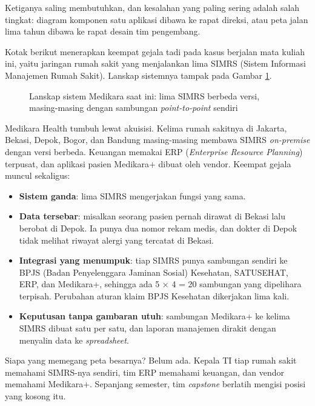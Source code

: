 Ketiganya saling membutuhkan, dan kesalahan yang paling sering adalah salah
tingkat: diagram komponen satu aplikasi dibawa ke rapat direksi, atau peta
jalan lima tahun dibawa ke rapat desain tim pengembang.

Kotak berikut menerapkan keempat gejala tadi pada kasus berjalan mata kuliah
ini, yaitu jaringan rumah sakit yang menjalankan lima SIMRS (Sistem Informasi
Manajemen Rumah Sakit). Lanskap sistemnya tampak pada Gambar
\ref{fig:ch01-lanskap}.

\begin{figure}[!htb]
  \centering
  
  \caption{Lanskap sistem Medikara saat ini: lima SIMRS berbeda versi, masing-masing
           dengan sambungan \textit{point-to-point} sendiri}
  \label{fig:ch01-lanskap}
\end{figure}

\begin{kasus}[title={Kasus Medikara Health: Lima Rumah Sakit, Lima SIMRS}]
  Medikara Health tumbuh lewat akuisisi. Kelima rumah sakitnya di Jakarta,
  Bekasi, Depok, Bogor, dan Bandung masing-masing membawa SIMRS
  \textit{on-premise} dengan versi berbeda. Keuangan memakai ERP
  (\textit{Enterprise Resource Planning}) terpusat, dan aplikasi pasien
  Medikara+ dibuat oleh vendor. Keempat gejala muncul sekaligus:

  \begin{itemize}
    \item \textbf{Sistem ganda}: lima SIMRS mengerjakan fungsi yang sama.
    \item \textbf{Data tersebar}: misalkan seorang pasien pernah dirawat di
          Bekasi lalu berobat di Depok. Ia punya dua nomor rekam medis, dan
          dokter di Depok tidak melihat riwayat alergi yang tercatat di Bekasi.
    \item \textbf{Integrasi yang menumpuk}: tiap SIMRS punya sambungan sendiri
          ke BPJS (Badan Penyelenggara Jaminan Sosial) Kesehatan, SATUSEHAT,
          ERP, dan Medikara+, sehingga ada 5 $\times$ 4 = 20 sambungan yang
          dipelihara terpisah. Perubahan aturan klaim BPJS Kesehatan dikerjakan
          lima kali.
    \item \textbf{Keputusan tanpa gambaran utuh}: sambungan Medikara+ ke kelima
          SIMRS dibuat satu per satu, dan laporan manajemen dirakit dengan
          menyalin data ke \textit{spreadsheet}.
  \end{itemize}

  Siapa yang memegang peta besarnya? Belum ada. Kepala TI tiap rumah sakit
  memahami SIMRS-nya sendiri, tim ERP memahami keuangan, dan vendor memahami
  Medikara+. Sepanjang semester, tim \textit{capstone} berlatih mengisi posisi
  yang kosong itu.
\end{kasus}


